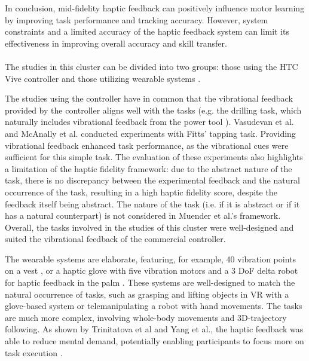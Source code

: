 In conclusion, mid-fidelity haptic feedback can positively influence motor learning by improving task performance and tracking accuracy. However, system constraints and a limited accuracy of the haptic feedback system can limit its effectiveness in improving overall accuracy and skill transfer.


\paragraph{}
The studies in this cluster can be divided into two groups: those using the HTC Vive controller \cite{Vasudevan2020, Yang2023, McAnally2023} and those utilizing wearable systems \cite{LiuH2019, Trinitatova2023, Xia2023}.

The studies using the controller have in common that the vibrational feedback provided by the controller aligns well with the tasks (e.g. the drilling task, which naturally includes vibrational feedback from the power tool \cite{Yang2023}). 
Vasudevan et al. and McAnally et al. conducted experiments with Fitts' tapping task. Providing vibrational feedback enhanced task performance, as the vibrational cues were sufficient for this simple task. The evaluation of these experiments also highlights a limitation of the haptic fidelity framework: due to the abstract nature of the task, there is no discrepancy between the experimental feedback and the natural occurrence of the task, resulting in a high haptic fidelity score, despite the feedback itself being abstract. The nature of the task (i.e. if it is abstract or if it has a natural counterpart) is not considered in Muender et al.'s framework.
Overall, the tasks involved in the studies of this cluster were well-designed and suited the vibrational feedback of the commercial controller.

The wearable systems are elaborate, featuring, for example, 40 vibration points on a vest \cite{Xia2023}, or a haptic glove with five vibration motors and a 3 DoF delta robot for haptic feedback in the palm \cite{Trinitatova2023}. These systems are well-designed to match the natural occurrence of tasks, such as grasping and lifting objects in VR with a glove-based system or telemanipulating a robot with hand movements. The tasks are much more complex, involving whole-body movements and 3D-trajectory following. As shown by Trinitatova et al and Yang et al., the haptic feedback was able to reduce mental demand, potentially enabling participants to focus more on task execution \cite{Trinitatova2023, Yang2023}.

